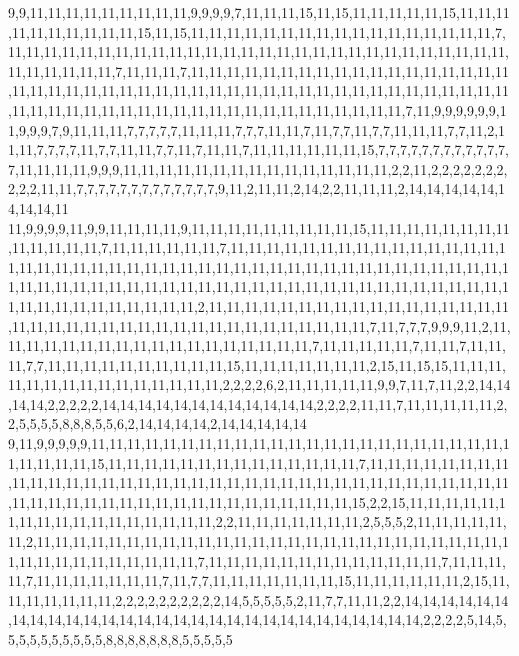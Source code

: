 9,9,11,11,11,11,11,11,11,11,11,9,9,9,9,7,11,11,11,15,11,15,11,11,11,11,11,15,11,11,11,11,11,11,11,11,11,11,15,11,15,11,11,11,11,11,11,11,11,11,11,11,11,11,11,11,11,11,7,11,11,11,11,11,11,11,11,11,11,11,11,11,11,11,11,11,11,11,11,11,11,11,11,11,11,11,11,11,11,11,11,11,11,7,11,11,11,7,11,11,11,11,11,11,11,11,11,11,11,11,11,11,11,11,11,11,11,11,11,11,11,11,11,11,11,11,11,11,11,11,11,11,11,11,11,11,11,11,11,11,11,11,11,11,11,11,11,11,11,11,11,11,11,11,11,11,11,11,11,11,11,11,11,11,11,11,7,11,9,9,9,9,9,9,11,9,9,9,7,9,11,11,11,7,7,7,7,7,11,11,11,7,7,7,11,11,7,11,7,7,11,7,7,11,11,11,7,7,11,2,11,11,7,7,7,7,11,7,7,11,11,7,7,11,7,11,11,7,11,11,11,11,11,11,15,7,7,7,7,7,7,7,7,7,7,7,7,7,11,11,11,11,9,9,9,11,11,11,11,11,11,11,11,11,11,11,11,11,11,11,2,2,11,2,2,2,2,2,2,2,2,2,2,11,11,7,7,7,7,7,7,7,7,7,7,7,7,7,9,11,2,11,11,2,14,2,2,11,11,11,2,14,14,14,14,14,14,14,14,11
11,9,9,9,9,11,9,9,11,11,11,11,9,11,11,11,11,11,11,11,11,11,15,11,11,11,11,11,11,11,11,11,11,11,11,11,7,11,11,11,11,11,11,7,11,11,11,11,11,11,11,11,11,11,11,11,11,11,11,11,11,11,11,11,11,11,11,11,11,11,11,11,11,11,11,11,11,11,11,11,11,11,11,11,11,11,11,11,11,11,11,11,11,11,11,11,11,11,11,11,11,11,11,11,11,11,11,11,11,11,11,11,11,11,11,11,11,11,11,11,11,11,11,11,11,11,2,11,11,11,11,11,11,11,11,11,11,11,11,11,11,11,11,11,11,11,11,11,11,11,11,11,11,11,11,11,11,11,11,11,11,11,11,11,7,11,7,7,7,9,9,9,11,2,11,11,11,11,11,11,11,11,11,11,11,11,11,11,11,11,11,11,7,11,11,11,11,11,7,11,11,7,11,11,11,7,7,11,11,11,11,11,11,11,11,11,11,15,11,11,11,11,11,11,11,2,15,11,15,15,11,11,11,11,11,11,11,11,11,11,11,11,11,11,11,2,2,2,2,6,2,11,11,11,11,11,9,9,7,11,7,11,2,2,14,14,14,14,2,2,2,2,2,14,14,14,14,14,14,14,14,14,14,14,14,2,2,2,2,11,11,7,11,11,11,11,11,2,2,5,5,5,5,8,8,8,5,5,6,2,14,14,14,14,2,14,14,14,14,14
9,11,9,9,9,9,9,11,11,11,11,11,11,11,11,11,11,11,11,11,11,11,11,11,11,11,11,11,11,11,11,11,11,11,11,15,11,11,11,11,11,11,11,11,11,11,11,11,11,11,7,11,11,11,11,11,11,11,11,11,11,11,11,11,11,11,11,11,11,11,11,11,11,11,11,11,11,11,11,11,11,11,11,11,11,11,11,11,11,11,11,11,11,11,11,11,11,11,11,11,11,11,11,11,11,11,15,2,2,15,11,11,11,11,11,11,11,11,11,11,11,11,11,11,11,11,11,2,2,11,11,11,11,11,11,11,2,5,5,5,2,11,11,11,11,11,11,2,11,11,11,11,11,11,11,11,11,11,11,11,11,11,11,11,11,11,11,11,11,11,11,11,11,11,11,11,11,11,11,11,11,11,11,11,11,7,11,11,11,11,11,11,11,11,11,11,11,11,11,7,11,11,11,11,7,11,11,11,11,11,11,11,7,11,7,7,11,11,11,11,11,11,11,15,11,11,11,11,11,11,2,15,11,11,11,11,11,11,11,2,2,2,2,2,2,2,2,2,2,14,5,5,5,5,5,2,11,7,7,11,11,2,2,14,14,14,14,14,14,14,14,14,14,14,14,14,14,14,14,14,14,14,14,14,14,14,14,14,14,14,14,14,2,2,2,2,5,14,5,5,5,5,5,5,5,5,5,5,8,8,8,8,8,8,8,5,5,5,5,5

